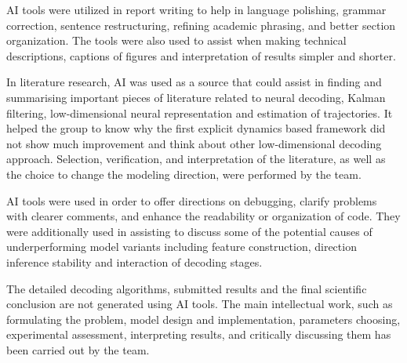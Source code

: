 \documentclass[conference]{IEEEtran}
\begin{document}
AI tools were utilized in report writing to help in language polishing, grammar correction, sentence restructuring, refining academic phrasing, and better section organization. The tools were also used to assist when making technical descriptions, captions of figures and interpretation of results simpler and shorter.

In literature research, AI was used as a source that could assist in finding and summarising important pieces of literature related to neural decoding, Kalman filtering, low-dimensional neural representation and estimation of trajectories. It helped the group to know why the first explicit dynamics based framework did not show much improvement and think about other low-dimensional decoding approach. Selection, verification, and interpretation of the literature, as well as the choice to change the modeling direction, were performed by the team.

AI tools were used in order to offer directions on debugging, clarify problems with clearer comments, and enhance the readability or organization of code. They were additionally used in assisting to discuss some of the potential causes of underperforming model variants including feature construction, direction inference stability and interaction of decoding stages.

The detailed decoding algorithms, submitted results and the final scientific conclusion are not generated using AI tools. The main intellectual work, such as formulating the problem, model design and implementation, parameters choosing, experimental assessment, interpreting results, and critically discussing them has been carried out by the team.




\end{document}
